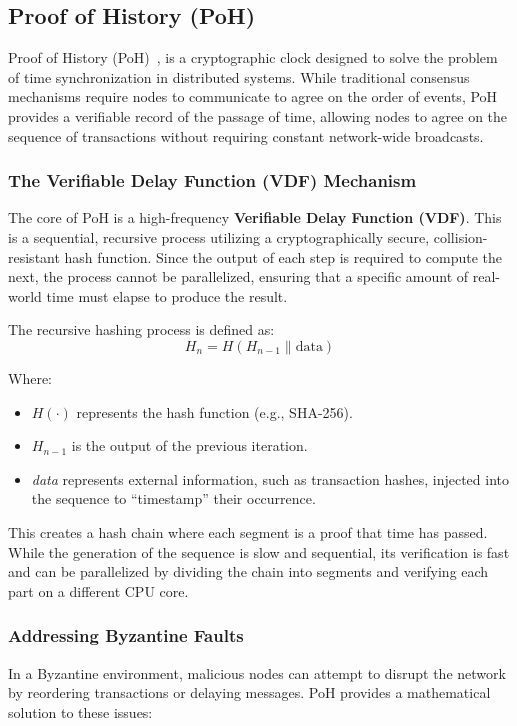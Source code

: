 \subsection{Proof of History (PoH)}
Proof of History (PoH)~\cite{mishra2024solana}, is a cryptographic clock designed to solve the problem of time synchronization in distributed systems. While traditional consensus mechanisms require nodes to communicate to agree on the order of events, PoH provides a verifiable record of the passage of time, allowing nodes to agree on the sequence of transactions without requiring constant network-wide broadcasts.

\subsubsection{The Verifiable Delay Function (VDF) Mechanism}
The core of PoH is a high-frequency \textbf{Verifiable Delay Function (VDF)}. This is a sequential, recursive process utilizing a cryptographically secure, collision-resistant hash function. Since the output of each step is required to compute the next, the process cannot be parallelized, ensuring that a specific amount of real-world time must elapse to produce the result.

The recursive hashing process is defined as:
\begin{equation}
    H_{n} = H(H_{n-1} \parallel \text{data})
\end{equation}

Where:
\begin{itemize}
    \item $H(\cdot)$ represents the hash function (e.g., SHA-256).
    \item $H_{n-1}$ is the output of the previous iteration.
    \item \textit{data} represents external information, such as transaction hashes, injected into the sequence to \enquote{timestamp} their occurrence.
\end{itemize}

This creates a hash chain where each segment is a proof that time has passed. While the generation of the sequence is slow and sequential, its verification is fast and can be parallelized by dividing the chain into segments and verifying each part on a different CPU core.

\subsubsection{Addressing Byzantine Faults}
In a Byzantine environment, malicious nodes can attempt to disrupt the network by reordering transactions or delaying messages. PoH provides a mathematical solution to these issues:

